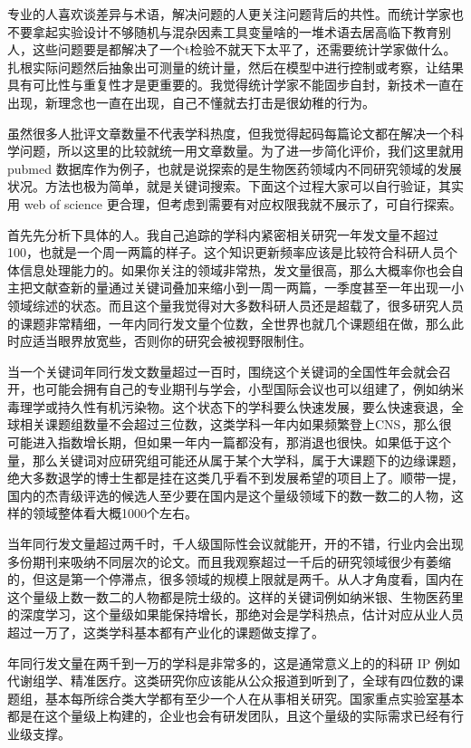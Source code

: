 \documentclass[]{tufte-book}
\begin{document}
专业的人喜欢谈差异与术语，解决问题的人更关注问题背后的共性。而统计学家也不要拿起实验设计不够随机与混杂因素工具变量啥的一堆术语去居高临下教育别人，这些问题要是都解决了一个t检验不就天下太平了，还需要统计学家做什么。扎根实际问题然后抽象出可测量的统计量，然后在模型中进行控制或考察，让结果具有可比性与重复性才是更重要的。我觉得统计学家不能固步自封，新技术一直在出现，新理念也一直在出现，自己不懂就去打击是很幼稚的行为。

虽然很多人批评文章数量不代表学科热度，但我觉得起码每篇论文都在解决一个科学问题，所以这里的比较就统一用文章数量。为了进一步简化评价，我们这里就用 pubmed 数据库作为例子，也就是说探索的是生物医药领域内不同研究领域的发展状况。方法也极为简单，就是关键词搜索。下面这个过程大家可以自行验证，其实用 web of science 更合理，但考虑到需要有对应权限我就不展示了，可自行探索。

首先先分析下具体的人。我自己追踪的学科内紧密相关研究一年发文量不超过100，也就是一个周一两篇的样子。这个知识更新频率应该是比较符合科研人员个体信息处理能力的。如果你关注的领域非常热，发文量很高，那么大概率你也会自主把文献查新的量通过关键词叠加来缩小到一周一两篇，一季度甚至一年出现一小领域综述的状态。而且这个量我觉得对大多数科研人员还是超载了，很多研究人员的课题非常精细，一年内同行发文量个位数，全世界也就几个课题组在做，那么此时应适当眼界放宽些，否则你的研究会被视野限制住。

当一个关键词年同行发文数量超过一百时，围绕这个关键词的全国性年会就会召开，也可能会拥有自己的专业期刊与学会，小型国际会议也可以组建了，例如纳米毒理学或持久性有机污染物。这个状态下的学科要么快速发展，要么快速衰退，全球相关课题组数量不会超过三位数，这类学科一年内如果频繁登上CNS，那么很可能进入指数增长期，但如果一年内一篇都没有，那消退也很快。如果低于这个量，那么关键词对应研究组可能还从属于某个大学科，属于大课题下的边缘课题，绝大多数退学的博士生都是挂在这类几乎看不到发展希望的项目上了。顺带一提，国内的杰青级评选的候选人至少要在国内是这个量级领域下的数一数二的人物，这样的领域整体看大概1000个左右。

当年同行发文量超过两千时，千人级国际性会议就能开，开的不错，行业内会出现多份期刊来吸纳不同层次的论文。而且我观察超过一千后的研究领域很少有萎缩的，但这是第一个停滞点，很多领域的规模上限就是两千。从人才角度看，国内在这个量级上数一数二的人物都是院士级的。这样的关键词例如纳米银、生物医药里的深度学习，这个量级如果能保持增长，那绝对会是学科热点，估计对应从业人员超过一万了，这类学科基本都有产业化的课题做支撑了。

年同行发文量在两千到一万的学科是非常多的，这是通常意义上的的科研 IP 例如代谢组学、精准医疗。这类研究你应该能从公众报道到听到了，全球有四位数的课题组，基本每所综合类大学都有至少一个人在从事相关研究。国家重点实验室基本都是在这个量级上构建的，企业也会有研发团队，且这个量级的实际需求已经有行业级支撑。
\end{document}
